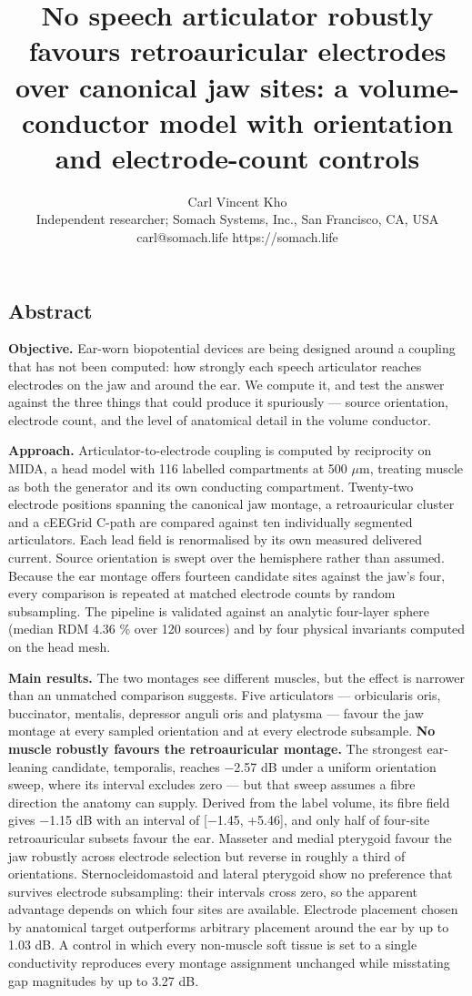 \documentclass[
  11pt,
]{article}
\title{No speech articulator robustly favours retroauricular electrodes over canonical jaw sites: a volume-conductor model with orientation and electrode-count controls}
\author{Carl Vincent Kho \\ Independent researcher; Somach Systems, Inc., San Francisco, CA, USA \\ carl@somach.life \textperiodcentered{} https://somach.life}
\date{}
\begin{document}
\maketitle

\subsection{Abstract}\label{abstract}

\textbf{Objective.} Ear-worn biopotential devices are being designed around a
coupling that has not been computed: how strongly each speech articulator
reaches electrodes on the jaw and around the ear. We compute it, and test the
answer against the three things that could produce it spuriously --- source
orientation, electrode count, and the level of anatomical detail in the volume
conductor.

\textbf{Approach.} Articulator-to-electrode coupling is computed by reciprocity on
MIDA, a head model with 116 labelled compartments at 500 \(\mu\)m, treating muscle as
both the generator and its own conducting compartment. Twenty-two electrode
positions spanning the canonical jaw montage, a retroauricular cluster and a
cEEGrid C-path are compared against ten individually segmented articulators.
Each lead field is renormalised by its own measured delivered current. Source
orientation is swept over the hemisphere rather than assumed. Because the ear
montage offers fourteen candidate sites against the jaw's four, every comparison
is repeated at matched electrode counts by random subsampling. The pipeline is
validated against an analytic four-layer sphere (median RDM 4.36 \% over 120
sources) and by four physical invariants computed on the head mesh.

\textbf{Main results.} The two montages see different muscles, but the effect is
narrower than an unmatched comparison suggests. Five articulators ---
orbicularis oris, buccinator, mentalis, depressor anguli oris and platysma ---
favour the jaw montage at every sampled orientation and at every electrode
subsample. \textbf{No muscle robustly favours the retroauricular montage.} The
strongest ear-leaning candidate, temporalis, reaches −2.57 dB under a uniform
orientation sweep, where its interval excludes zero --- but that sweep assumes a
fibre direction the anatomy can supply. Derived from the label volume, its fibre
field gives −1.15 dB with an interval of {[}−1.45, +5.46{]}, and only half of
four-site retroauricular subsets favour the ear. Masseter and medial pterygoid
favour the jaw robustly across electrode selection but reverse in roughly a
third of orientations. Sternocleidomastoid and lateral pterygoid show no
preference that survives electrode subsampling: their intervals cross zero, so
the apparent advantage depends on which four sites are available. Electrode
placement chosen by anatomical target outperforms arbitrary placement around
the ear by up to 1.03 dB. A control in which every non-muscle soft tissue is
set to a single conductivity reproduces every montage assignment unchanged
while misstating gap magnitudes by up to 3.27 dB.
\end{document}
